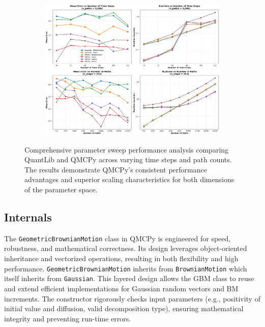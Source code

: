\begin{figure}[H]
    \centering
    \begin{subfigure}{1\textwidth}
        \centering
        \includegraphics[width=\textwidth]{GBM/images/figure_7.png}
        \label{subfig:performance_steps2}
    \end{subfigure}

    \caption{Comprehensive parameter sweep performance analysis comparing QuantLib and QMCPy across varying time steps and path counts. The results demonstrate QMCPy's consistent performance advantages and superior scaling characteristics for both dimensions of the parameter space.}
    \label{fig:gbm_performance2}
\end{figure}

\subsection{Internals}

The \texttt{GeometricBrownianMotion} class in QMCPy is engineered for speed, robustness, and mathematical correctness. Its design leverages object-oriented inheritance and vectorized operations, resulting in both flexibility and high performance.
\texttt{GeometricBrownianMotion} inherits from \texttt{BrownianMotion} which itself inherits from \texttt{Gaussian}. This layered design allows the GBM class to reuse and extend efficient implementations for Gaussian random vectors and BM increments.
The constructor rigorously checks input parameters (e.g., positivity of initial value and diffusion, valid decomposition type), ensuring mathematical integrity and preventing run-time errors.

